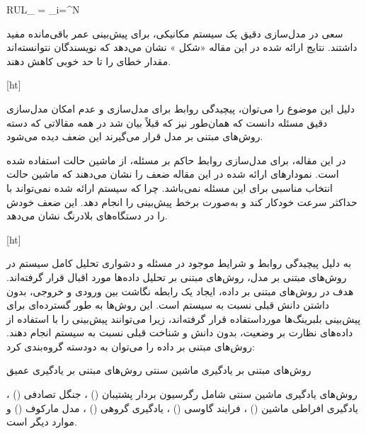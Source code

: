 RUL_{} = \sum_{i=}^{N} 


سعی در مدل‌سازی دقیق یک سیستم مکانیکی، برای پیش‌بینی عمر باقی‌مانده مفید داشتند. نتایج ارائه شده در این مقاله «شکل » نشان می‌دهد که نویسندگان نتوانسته‌اند مقدار خطای  را تا حد خوبی کاهش دهند.



[ht]

دلیل این موضوع را می‌توان، پیچیدگی روابط برای مدل‌سازی و عدم امکان مدل‌سازی دقیق مسئله دانست که همان‌طور نیز که قبلاً بیان شد در همه مقالاتی که دسته روش‌های مبتنی بر مدل قرار می‌گیرند این ضعف دیده می‌شود.

در این مقاله، برای مدل‌سازی روابط حاکم بر مسئله، از ماشین حالت استفاده شده است. نمودارهای ارائه شده در این مقاله ضعف را نشان می‌دهند که ماشین حالت انتخاب مناسبی برای این مسئله نمی‌باشد. چرا که سیستم ارائه شده نمی‌تواند با حداکثر سرعت خودکار کند و به‌صورت برخط پیش‌بینی را انجام دهد. این ضعف خودش را در دستگاه‌های بلادرنگ نشان می‌دهد.



[ht]


به دلیل پیچیدگی روابط و شرایط موجود در مسئله و دشواری تحلیل کامل سیستم در روش‌های مبتنی بر مدل، روش‌های مبتنی بر تحلیل داده‌ها مورد اقبال قرار گرفته‌اند. هدف در روش‌های مبتنی بر داده، ایجاد یک رابطه نگاشت بین ورودی و خروجی، بدون داشتن دانش قبلی نسبت به سیستم است. این روش‌ها به طور گسترده‌ای برای پیش‌بینی  بلبرینگ‌ها مورداستفاده قرار گرفته‌اند، زیرا می‌توانند پیش‌بینی را با استفاده از داده‌های نظارت بر وضعیت، بدون دانش و شناخت قبلی نسبت به سیستم انجام دهند. روش‌های مبتنی بر داده را می‌توان به دودسته گروه‌بندی کرد:


 روش‌های مبتنی بر یادگیری ماشین سنتی
 روش‌های مبتنی بر یادگیری عمیق

	



روش‌های یادگیری ماشین سنتی شامل رگرسیون بردار پشتیبان () ، جنگل تصادفی () ، یادگیری افراطی ماشین () ، فرایند گاوسی () ، یادگیری گروهی () ، مدل مارکوف ()  و موارد دیگر است.



